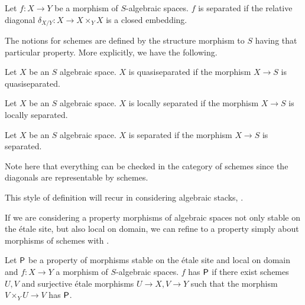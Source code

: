 \begin{definition}\label{def: separated morphism of spaces}
    Let $f:X\to Y$ be a morphism of $S$-algebraic spaces. $f$ is separated if the relative diagonal $\delta_{X/Y}:X\to X\times_{Y}X$ is a closed embedding.
\end{definition}
The notions for schemes are defined by the structure morphism to $S$ having that particular property. More explicitly, we have the following. 
\begin{definition}\label{def: quasiseparated space}
    Let $X$ be an $S$ algebraic space. $X$ is quasiseparated if the morphism $X\to S$ is quasiseparated.
\end{definition}
\begin{definition}\label{def: locally separated space}
    Let $X$ be an $S$ algebraic space. $X$ is locally separated if the morphism $X\to S$ is locally separated.
\end{definition}
\begin{definition}\label{def: separated space}
    Let $X$ be an $S$ algebraic space. $X$ is separated if the morphism $X\to S$ is separated. 
\end{definition}
\begin{remark}
    Note here that everything can be checked in the category of schemes since the diagonals are representable by schemes. 
\end{remark}
\begin{remark}
    This style of definition will recur in considering algebraic stacks, .
\end{remark}
If we are considering a property morphisms of algebraic spaces not only stable on the \'{e}tale site, but also local on domain, we can refine  to a property simply about morphisms of schemes with . 
\begin{definition}\label{def: properties of morphisms of spaces via schemes}
    Let $\mathsf{P}$ be a property of morphisms stable on the \'{e}tale site and local on domain and $f:X\to Y$ a morphism of $S$-algebraic spaces. $f$ has $\mathsf{P}$ if there exist schemes $U,V$ and surjective \'{e}tale morphisms $U\to X, V\to Y$ such that the morphism $V\times_{Y}U\to V$ has $\mathsf{P}$. 
\end{definition}
